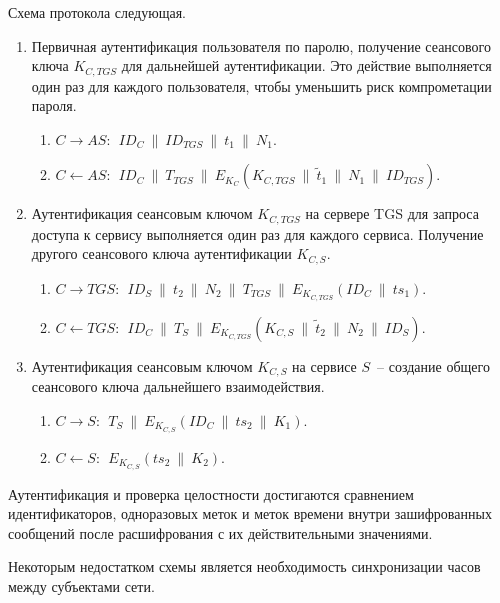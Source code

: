 Схема протокола следующая.
\begin{enumerate}
    \item Первичная аутентификация пользователя по паролю, получение сеансового ключа $K_{C,TGS}$ для дальнейшей аутентификации. Это действие выполняется один раз для каждого пользователя, чтобы уменьшить риск компрометации пароля.
        \begin{enumerate}
            \item $C \rightarrow AS: ~~ ID_C ~\|~ ID_{TGS} ~\|~ t_1 ~\|~ N_1$.
            \item $C \leftarrow AS: ~~ ID_C ~\|~ T_{TGS} ~\|~ E_{K_C}( K_{C,TGS} ~\|~ \tilde{t}_1 ~\|~ N_1 ~\|~ ID_{TGS})$.
        \end{enumerate}
    \item Аутентификация сеансовым ключом $K_{C,TGS}$ на сервере TGS для запроса доступа к сервису выполняется один раз для каждого сервиса. Получение другого сеансового ключа аутентификации $K_{C,S}$.
        \begin{enumerate}
            \item $C \rightarrow TGS: ~~ ID_S ~\|~ t_2 ~\|~ N_2 ~\|~ T_{TGS} ~\|~ E_{K_{C,TGS}}(ID_C ~\|~ ts_1)$.
            \item $C \leftarrow TGS: ~~ ID_C ~\|~ T_{S} ~\|~ E_{K_{C,TGS}}( K_{C,S} ~\|~ \tilde{t}_2 ~\|~ N_2 ~\|~ ID_S)$.
        \end{enumerate}
    \item Аутентификация сеансовым ключом $K_{C,S}$ на сервисе $S$~-- создание общего сеансового ключа дальнейшего взаимодействия.
        \begin{enumerate}
            \item $C \rightarrow S: ~~ T_{S} ~\|~ E_{K_{C,S}}(ID_C ~\|~ ts_2 ~\|~ K_1)$.
            \item $C \leftarrow S: ~~ E_{K_{C,S}}( ts_2 ~\|~ K_2)$.
        \end{enumerate}
\end{enumerate}

Аутентификация и проверка целостности достигаются сравнением идентификаторов, одноразовых меток и меток времени внутри зашифрованных сообщений после расшифрования с их действительными значениями.

Некоторым недостатком схемы является необходимость синхронизации часов между субъектами сети.
